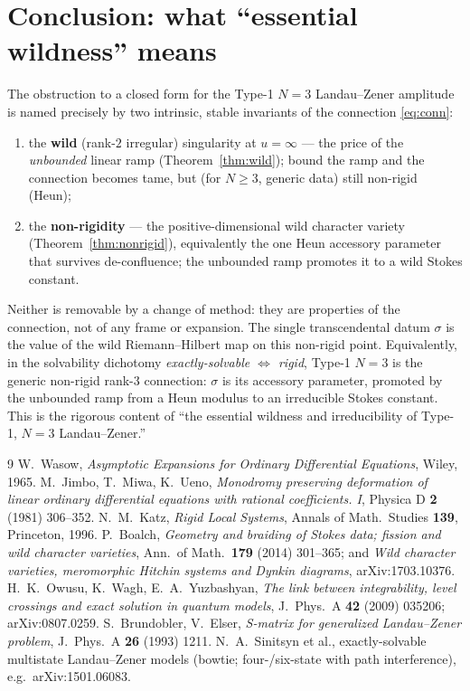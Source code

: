 \documentclass[11pt]{article}
\theoremstyle{definition}
\begin{document}
\section{Conclusion: what ``essential wildness'' means}\label{sec:concl}

The obstruction to a closed form for the Type-1 $N{=}3$ Landau--Zener amplitude is named precisely by two
intrinsic, stable invariants of the connection \eqref{eq:conn}:
\begin{enumerate}
\item the \textbf{wild} (rank-$2$ irregular) singularity at $u=\infty$ --- the price of the \emph{unbounded}
linear ramp (Theorem~\ref{thm:wild}); bound the ramp and the connection becomes tame, but (for $N\ge3$,
generic data) still non-rigid (Heun);
\item the \textbf{non-rigidity} --- the positive-dimensional wild character variety
(Theorem~\ref{thm:nonrigid}), equivalently the one Heun accessory parameter that survives de-confluence; the
unbounded ramp promotes it to a wild Stokes constant.
\end{enumerate}
Neither is removable by a change of method: they are properties of the connection, not of any frame or
expansion. The single transcendental datum $\sigma$ is the value of the wild Riemann--Hilbert map on this
non-rigid point. Equivalently, in the solvability dichotomy \emph{exactly-solvable $\Leftrightarrow$ rigid},
Type-1 $N{=}3$ is the generic non-rigid rank-$3$ connection: $\sigma$ is its accessory parameter, promoted by
the unbounded ramp from a Heun modulus to an irreducible Stokes constant. This is the rigorous content of
``the essential wildness and irreducibility of Type-1, $N{=}3$ Landau--Zener.''

\begin{thebibliography}{9}
 W.~Wasow, \emph{Asymptotic Expansions for Ordinary Differential Equations}, Wiley, 1965.
 M.~Jimbo, T.~Miwa, K.~Ueno, \emph{Monodromy preserving deformation of linear ordinary
differential equations with rational coefficients. I}, Physica D \textbf{2} (1981) 306--352.
 N.~M.~Katz, \emph{Rigid Local Systems}, Annals of Math.\ Studies \textbf{139}, Princeton, 1996.
 P.~Boalch, \emph{Geometry and braiding of Stokes data; fission and wild character
varieties}, Ann.\ of Math.\ \textbf{179} (2014) 301--365; and \emph{Wild character varieties, meromorphic
Hitchin systems and Dynkin diagrams}, arXiv:1703.10376.
 H.~K.~Owusu, K.~Wagh, E.~A.~Yuzbashyan, \emph{The link between integrability, level crossings
and exact solution in quantum models}, J.\ Phys.\ A \textbf{42} (2009) 035206; arXiv:0807.0259.
 S.~Brundobler, V.~Elser, \emph{S-matrix for generalized Landau--Zener problem}, J.\ Phys.\ A
\textbf{26} (1993) 1211.
 N.~A.~Sinitsyn et al., exactly-solvable multistate Landau--Zener models (bowtie;
four-/six-state with path interference), e.g.\ arXiv:1501.06083.
\end{thebibliography}
\end{document}
